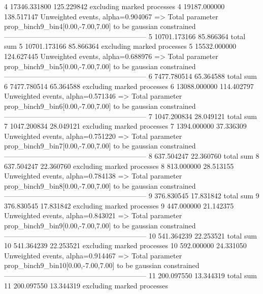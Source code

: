 4          17346.331800    125.229842      excluding marked processes    
4          19187.000000    138.517147      Unweighted events, alpha=0.904067
  => Total parameter prop_binch9_bin4[0.00,-7.00,7.00] to be gaussian constrained
------------------------------------------------------------
5          10701.173166    85.866364       total sum                     
5          10701.173166    85.866364       excluding marked processes    
5          15532.000000    124.627445      Unweighted events, alpha=0.688976
  => Total parameter prop_binch9_bin5[0.00,-7.00,7.00] to be gaussian constrained
------------------------------------------------------------
6          7477.780514     65.364588       total sum                     
6          7477.780514     65.364588       excluding marked processes    
6          13088.000000    114.402797      Unweighted events, alpha=0.571346
  => Total parameter prop_binch9_bin6[0.00,-7.00,7.00] to be gaussian constrained
------------------------------------------------------------
7          1047.200834     28.049121       total sum                     
7          1047.200834     28.049121       excluding marked processes    
7          1394.000000     37.336309       Unweighted events, alpha=0.751220
  => Total parameter prop_binch9_bin7[0.00,-7.00,7.00] to be gaussian constrained
------------------------------------------------------------
8          637.504247      22.360760       total sum                     
8          637.504247      22.360760       excluding marked processes    
8          813.000000      28.513155       Unweighted events, alpha=0.784138
  => Total parameter prop_binch9_bin8[0.00,-7.00,7.00] to be gaussian constrained
------------------------------------------------------------
9          376.830545      17.831842       total sum                     
9          376.830545      17.831842       excluding marked processes    
9          447.000000      21.142375       Unweighted events, alpha=0.843021
  => Total parameter prop_binch9_bin9[0.00,-7.00,7.00] to be gaussian constrained
------------------------------------------------------------
10         541.364239      22.253521       total sum                     
10         541.364239      22.253521       excluding marked processes    
10         592.000000      24.331050       Unweighted events, alpha=0.914467
  => Total parameter prop_binch9_bin10[0.00,-7.00,7.00] to be gaussian constrained
------------------------------------------------------------
11         200.097550      13.344319       total sum                     
11         200.097550      13.344319       excluding marked processes    
